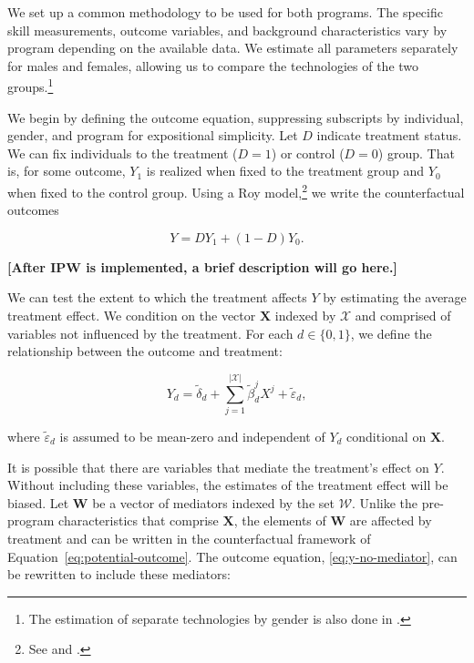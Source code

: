 We set up a common methodology to be used for both programs. The specific skill measurements, outcome variables, and background characteristics vary by program depending on the available data. We estimate all parameters separately for males and females, allowing us to compare the technologies of the two groups.\footnote{The estimation of separate technologies by gender is also done in \citet{Heckman_Pinto_etal_2013_PerryFactor}.} 

We begin by defining the outcome equation, suppressing subscripts by individual, gender, and program for expositional simplicity. Let $D$ indicate treatment status. We can fix individuals to the treatment ($D=1$) or control ($D=0$) group. That is, for some outcome, $Y_1$ is realized when fixed to the treatment group and $Y_0$ when fixed to the control group. Using a Roy model,\footnote{See \citet{Roy_1951_OEP} and \citet{Heckman_Honore_1990_Econometrica}.} we write the counterfactual outcomes

\begin{equation}
\label{eq:potential-outcome}
	Y = DY_1 + (1-D)Y_0.
\end{equation}

\textbf{[After IPW is implemented, a brief description will go here.]} 

We can test the extent to which the treatment affects $Y$ by estimating the average treatment effect. We condition on the vector $\bm{X}$ indexed by $\mathcal{X}$ and comprised of variables not influenced by the treatment. For each $d \in \{0,1\}$, we define the relationship between the outcome and treatment:

\begin{equation}
\label{eq:y-no-mediator}
	Y_d = \tilde{\delta}_d + \sum_{j = 1}^{|\mathcal{X}|} \tilde{\beta}_d^j X^j  + \tilde{\varepsilon}_d, 
\end{equation}

\noindent where $\tilde{\varepsilon}_d$ is assumed to be mean-zero and independent of $Y_d$ conditional on $\bm{X}$. 

It is possible that there are variables that mediate the treatment's effect on $Y$. Without including these variables, the estimates of the treatment effect will be biased. Let $\bm{W}$ be a vector of mediators indexed by the set $\mathcal{W}$. Unlike the pre-program characteristics that comprise $\bm{X}$, the elements of $\bm{W}$ are affected by treatment and can be written in the counterfactual framework of Equation~\eqref{eq:potential-outcome}. The outcome equation, \eqref{eq:y-no-mediator}, can be rewritten to include these mediators:

